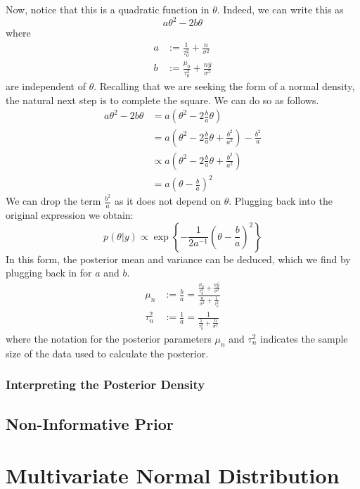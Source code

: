 \documentclass[12pt]{article}
\begin{document}
Now, notice that this is a quadratic function in $\theta$. Indeed, we can write this as 
\[a\theta^2 - 2b\theta\]
where 
\begin{align*}
a &:= \frac{1}{\tau_0^2} + \frac{n}{\sigma^2} \\
b &:= \frac{\mu_0}{\tau_0^2} + \frac{n \bar{y}}{\sigma^2}
\end{align*}
are independent of $\theta$. Recalling that we are seeking the form of a normal density, the natural next step is to complete the square. We can do so as follows. 
\begin{align*}
a\theta^2 - 2b\theta &= a\left(\theta^2 - 2\frac{b}{a} \theta \right) \\
		 	       &= a\left(\theta^2 - 2\frac{b}{a} \theta + \frac{b^2}{a^2} \right) - \frac{b^2}{a} \\
			       &\propto a\left(\theta^2 - 2\frac{b}{a} \theta + \frac{b^2}{a^2} \right) \\
			       &= a\left(\theta - \frac{b}{a}\right)^2
\end{align*}
We can drop the term $\frac{b^2}{a}$ as it does not depend on $\theta$. Plugging back into the original expression we obtain: 
\[p(\theta|y) \propto \exp\left\{-\frac{1}{2a^{-1}} \left(\theta - \frac{b}{a}\right)^2 \right\}\]
In this form, the posterior mean and variance can be deduced, which we find by plugging back in for $a$ and $b$. 
\begin{align*}
\mu_n &:= \frac{b}{a} = \frac{\frac{\mu_0}{\tau_0^2} + \frac{n\bar{y}}{\sigma^2}}{\frac{n}{\sigma^2} + \frac{1}{\tau_0^2}} \\
\tau_n^2 &:= \frac{1}{a} = \frac{1}{\frac{1}{\tau_0^2} + \frac{n}{\sigma^2}}
\end{align*}
where the notation for the posterior parameters $\mu_n$ and $\tau_n^2$ indicates the sample size of the data used to calculate the posterior. 

\subsubsection{Interpreting the Posterior Density}


\subsection{Non-Informative Prior}



\section{Multivariate Normal Distribution}
\end{document}
